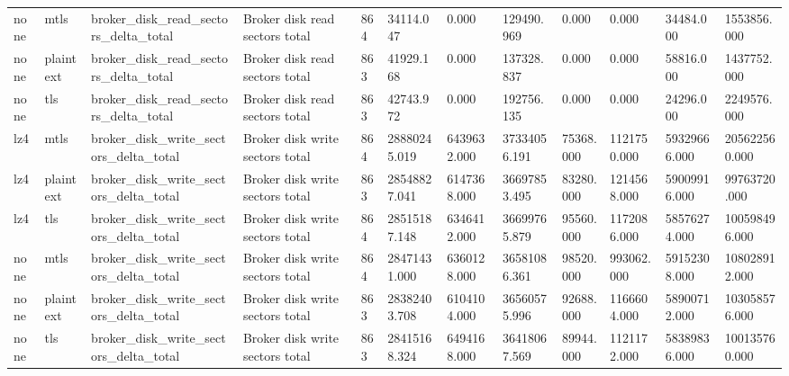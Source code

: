 \begin{longtable}{llllllllllll}
none & mtls & broker\_disk\_read\_sectors\_delta\_total & Broker disk read sectors total & 864 & 34114.047 & 0.000 & 129490.969 & 0.000 & 0.000 & 34484.000 & 1553856.000 \\
none & plaintext & broker\_disk\_read\_sectors\_delta\_total & Broker disk read sectors total & 863 & 41929.168 & 0.000 & 137328.837 & 0.000 & 0.000 & 58816.000 & 1437752.000 \\
none & tls & broker\_disk\_read\_sectors\_delta\_total & Broker disk read sectors total & 863 & 42743.972 & 0.000 & 192756.135 & 0.000 & 0.000 & 24296.000 & 2249576.000 \\
lz4 & mtls & broker\_disk\_write\_sectors\_delta\_total & Broker disk write sectors total & 864 & 28880245.019 & 6439632.000 & 37334056.191 & 75368.000 & 1121750.000 & 59329666.000 & 205622560.000 \\
lz4 & plaintext & broker\_disk\_write\_sectors\_delta\_total & Broker disk write sectors total & 863 & 28548827.041 & 6147368.000 & 36697853.495 & 83280.000 & 1214568.000 & 59009916.000 & 99763720.000 \\
lz4 & tls & broker\_disk\_write\_sectors\_delta\_total & Broker disk write sectors total & 864 & 28515187.148 & 6346412.000 & 36699765.879 & 95560.000 & 1172086.000 & 58576274.000 & 100598496.000 \\
none & mtls & broker\_disk\_write\_sectors\_delta\_total & Broker disk write sectors total & 864 & 28471431.000 & 6360128.000 & 36581086.361 & 98520.000 & 993062.000 & 59152308.000 & 108028912.000 \\
none & plaintext & broker\_disk\_write\_sectors\_delta\_total & Broker disk write sectors total & 863 & 28382403.708 & 6104104.000 & 36560575.996 & 92688.000 & 1166604.000 & 58900712.000 & 103058576.000 \\
none & tls & broker\_disk\_write\_sectors\_delta\_total & Broker disk write sectors total & 863 & 28415168.324 & 6494168.000 & 36418067.569 & 89944.000 & 1121172.000 & 58389836.000 & 100135760.000 \\
\hline
\end{longtable}
